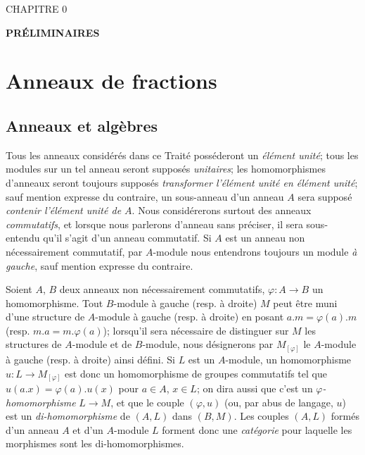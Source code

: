 \clearpage
{}
\begin{center}
{\large CHAPITRE 0\par}
\vspace{1.5em}
{\Large\bfseries PRÉLIMINAIRES\par}
\end{center}

\section{Anneaux de fractions}
\label{section:0.1-fr}

\setcounter{subsection}{-1}
\subsection{Anneaux et algèbres}
\label{subsection:0.1.0-fr}

\begin{env}[1.0.1]
\label{0.1.0.1-fr}
Tous les anneaux considérés dans ce Traité posséderont un \emph{élément unité};
tous les modules sur un tel anneau seront supposés \emph{unitaires}; les homomorphismes d'anneaux seront toujours supposés \emph{transformer l'élément unité en élément unité}; sauf mention expresse du contraire, un sous-anneau d'un anneau $A$ sera supposé \emph{contenir l'élément unité de $A$}.
Nous considérerons surtout des anneaux \emph{commutatifs}, et lorsque nous parlerons d'anneau sans préciser, il sera sous-entendu qu'il s'agit d'un anneau commutatif.
Si $A$ est un anneau non nécessairement commutatif, par $A$-module nous entendrons toujours un module \emph{à gauche}, sauf mention expresse du contraire.
\end{env}

\begin{env}[1.0.2]
\label{0.1.0.2-fr}
Soient $A$, $B$ deux anneaux non nécessairement commutatifs, $\varphi:A\to B$ un homomorphisme.
Tout $B$-module à gauche (resp. à droite) $M$ peut être muni d'une structure de $A$-module à gauche (resp. à droite) en posant $a.m=\varphi(a).m$ (resp. $m.a=m.\varphi(a)$); lorsqu'il sera nécessaire de distinguer sur $M$ les structures de $A$-module et de $B$-module, nous désignerons par $M_{[\varphi]}$ le $A$-module à gauche (resp. à droite) ainsi défini.
Si $L$ est un $A$-module, un homomorphisme $u:L\to M_{[\varphi]}$ est donc un homomorphisme de groupes commutatifs tel que $u(a.x)=\varphi(a).u(x)$ pour $a\in A$, $x\in L$; on dira aussi que c'est un \emph{$\varphi$-homomorphisme} $L\to M$, et que le couple $(\varphi,u)$ (ou, par abus de langage, $u$) est un \emph{di-homomorphisme} de $(A,L)$ dans $(B,M)$.
Les couples $(A,L)$ formés d'un anneau $A$ et d'un $A$-module $L$ forment donc une \emph{catégorie} pour laquelle les morphismes sont les di-homomorphismes.
\end{env}

